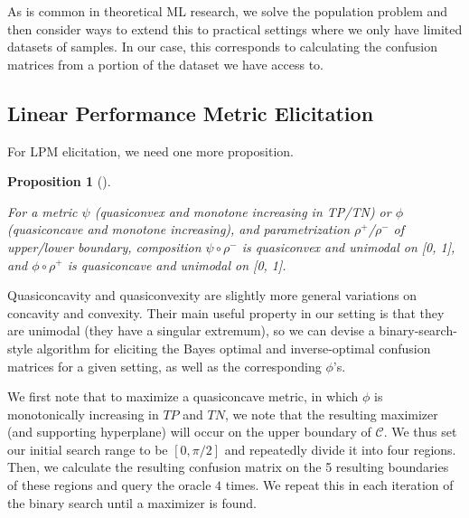 \documentclass[
  letterpaper,
  numbers=noenddot,
  DIV=11]{scrreprt}
\theoremstyle{definition}
\theoremstyle{plain}
\theoremstyle{plain}
\newtheorem{proposition}{Proposition}[chapter]
\theoremstyle{remark}
\begin{document}
As is common in theoretical ML research, we solve the population problem
and then consider ways to extend this to practical settings where we
only have limited datasets of samples. In our case, this corresponds to
calculating the confusion matrices from a portion of the dataset we have
access to.

\subsection{Linear Performance Metric Elicitation}\label{sec-orgb6dac4e}

For LPM elicitation, we need one more proposition.

\begin{tcolorbox}[colframe=.grey, title=\faPenSquare \enspace Proposition]

\begin{proposition}[]\protect\hypertarget{prp-prp3.2}{}\label{prp-prp3.2}

For a metric \(\psi\) (quasiconvex and monotone increasing in TP/TN) or
\(\phi\) (quasiconcave and monotone increasing), and parametrization
\(\rho^+\)/\(\rho^-\) of upper/lower boundary, composition
\(\psi \circ \rho^-\) is quasiconvex and unimodal on {[}0, 1{]}, and
\(\phi \circ \rho^+\) is quasiconcave and unimodal on {[}0, 1{]}.

\end{proposition}

\end{tcolorbox}

Quasiconcavity and quasiconvexity are slightly more general variations
on concavity and convexity. Their main useful property in our setting is
that they are unimodal (they have a singular extremum), so we can devise
a binary-search-style algorithm for eliciting the Bayes optimal and
inverse-optimal confusion matrices for a given setting, as well as the
corresponding \(\phi\)'s.

We first note that to maximize a quasiconcave metric, in which \(\phi\)
is monotonically increasing in \(TP\) and \(TN\), we note that the
resulting maximizer (and supporting hyperplane) will occur on the upper
boundary of \(\mathcal{C}\). We thus set our initial search range to be
\([0, \pi/2]\) and repeatedly divide it into four regions. Then, we
calculate the resulting confusion matrix on the 5 resulting boundaries
of these regions and query the oracle \(4\) times. We repeat this in
each iteration of the binary search until a maximizer is found.
\end{document}
